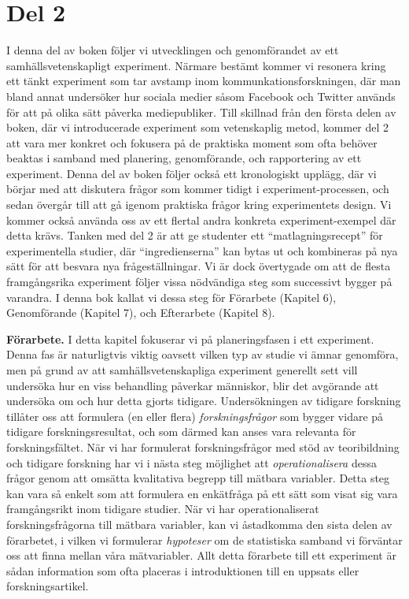 \documentclass[
]{book}
\begin{document}
\hypertarget{del-2}{%
\chapter*{Del 2}\label{del-2}}

I denna del av boken följer vi utvecklingen och genomförandet av ett samhällsvetenskapligt experiment. Närmare bestämt kommer vi resonera kring ett tänkt experiment som tar avstamp inom kommunkationsforskningen, där man bland annat undersöker hur sociala medier såsom Facebook och Twitter används för att på olika sätt påverka mediepubliker. Till skillnad från den första delen av boken, där vi introducerade experiment som vetenskaplig metod, kommer del 2 att vara mer konkret och fokusera på de praktiska moment som ofta behöver beaktas i samband med planering, genomförande, och rapportering av ett experiment. Denna del av boken följer också ett kronologiskt upplägg, där vi börjar med att diskutera frågor som kommer tidigt i experiment-processen, och sedan övergår till att gå igenom praktiska frågor kring experimentets design. Vi kommer också använda oss av ett flertal andra konkreta experiment-exempel där detta krävs. Tanken med del 2 är att ge studenter ett ``matlagningsrecept'' för experimentella studier, där ``ingredienserna'' kan bytas ut och kombineras på nya sätt för att besvara nya frågeställningar. Vi är dock övertygade om att de flesta framgångsrika experiment följer vissa nödvändiga steg som successivt bygger på varandra. I denna bok kallat vi dessa steg för Förarbete (Kapitel 6), Genomförande (Kapitel 7), och Efterarbete (Kapitel 8).

\textbf{Förarbete.} I detta kapitel fokuserar vi på planeringsfasen i ett experiment. Denna fas är naturligtvis viktig oavsett vilken typ av studie vi ämnar genomföra, men på grund av att samhällsvetenskapliga experiment generellt sett vill undersöka hur en viss behandling påverkar människor, blir det avgörande att undersöka om och hur detta gjorts tidigare. Undersökningen av tidigare forskning tillåter oss att formulera (en eller flera) \emph{forskningsfrågor} som bygger vidare på tidigare forskningsresultat, och som därmed kan anses vara relevanta för forskningsfältet. När vi har formulerat forskningsfrågor med stöd av teoribildning och tidigare forskning har vi i nästa steg möjlighet att \emph{operationalisera} dessa frågor genom att omsätta kvalitativa begrepp till mätbara variabler. Detta steg kan vara så enkelt som att formulera en enkätfråga på ett sätt som visat sig vara framgångsrikt inom tidigare studier. När vi har operationaliserat forskningsfrågorna till mätbara variabler, kan vi åstadkomma den sista delen av förarbetet, i vilken vi formulerar \emph{hypoteser} om de statistiska samband vi förväntar oss att finna mellan våra mätvariabler. Allt detta förarbete till ett experiment är sådan information som ofta placeras i introduktionen till en uppsats eller forskningsartikel.
\end{document}
